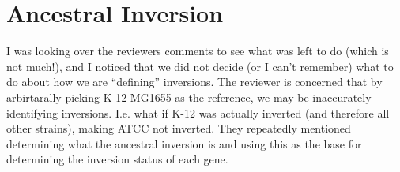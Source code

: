 \documentclass[12pt]{article}
\begin{document}
%
%
%
%
%
\section*{Ancestral Inversion}
I was looking over the reviewers comments to see what was left to do (which is not much!), and I noticed that we did not decide (or I can't remember) what to do about how we are ``defining'' inversions.
The reviewer is concerned that by arbirtarally picking K-12 MG1655 as the reference, we may be inaccurately identifying inversions. I.e. what if K-12 was actually inverted (and therefore all other strains), making ATCC not inverted. They repeatedly mentioned determining what the ancestral inversion is and using this as the base for determining the inversion status of each gene.
\end{document}
